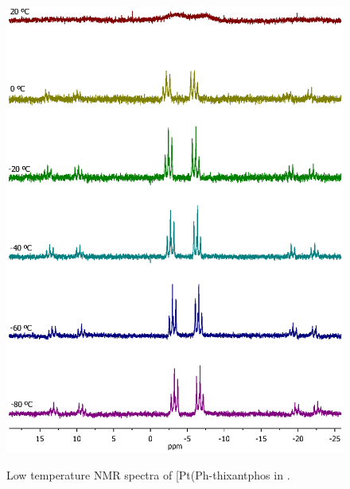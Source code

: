 \begin{figure}[htbp]
\begin{center}
\vspace{0.5cm}
\includegraphics[scale = 0.9, trim = 2cm 1.5cm 1.5cm 4cm, clip]{../NMR/1031-Pt(SPh)2-2.eps}
\caption[Low temperature \phosphorus{} NMR spectra of [Pt(Ph-thixantphos\ce{)2}{]}]{Low temperature \phosphorus{} NMR spectra of [Pt(Ph-thixantphos\ce{)2]} in .}
\vspace{0.2cm}
\label{BisSPhPt:PNMR}
\end{center}
\end{figure}
\vspace{0.2cm}

